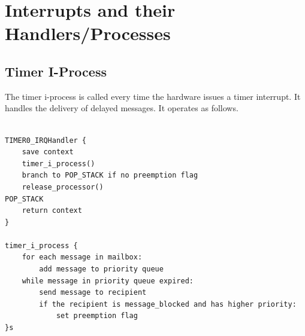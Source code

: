 \documentclass[12pt]{article}
\begin{document}
\section{Interrupts and their Handlers/Processes}
\subsection{Timer I-Process}
The timer i-process is called every time the hardware issues a timer interrupt. It handles the delivery of delayed messages. It operates as follows. \\ \\
\begin{verbatim}
TIMER0_IRQHandler {
    save context
    timer_i_process()
    branch to POP_STACK if no preemption flag
    release_processor()
POP_STACK
    return context
}

timer_i_process {
    for each message in mailbox:
        add message to priority queue
    while message in priority queue expired:
        send message to recipient
        if the recipient is message_blocked and has higher priority:
            set preemption flag
}s
\end{verbatim}
\end{document}

